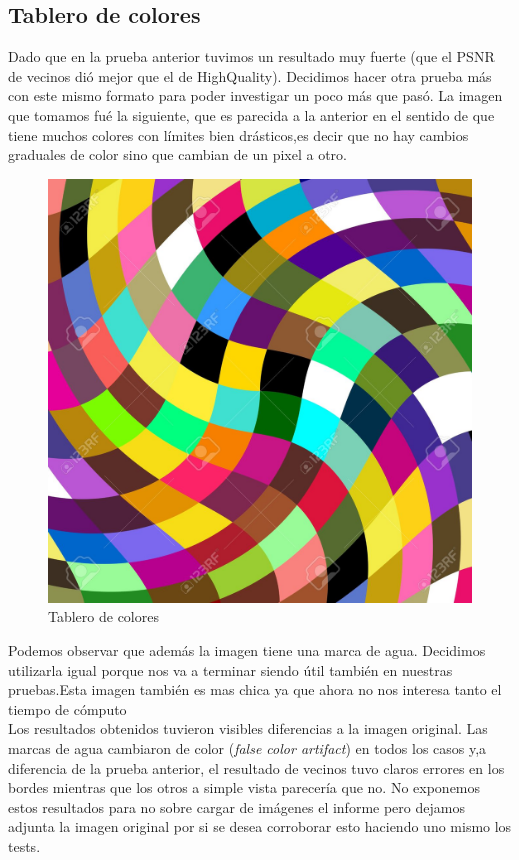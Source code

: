 {\subsection{Tablero de colores}
Dado que en la prueba anterior tuvimos un resultado muy fuerte (que el PSNR de vecinos dió mejor que el de HighQuality). Decidimos hacer otra prueba más con este mismo formato para poder investigar un poco más que pasó.
La imagen que tomamos fué la siguiente, que es parecida a la anterior en el sentido de que tiene muchos colores con límites bien drásticos,es decir que no hay cambios graduales de color sino que cambian de un pixel a otro. 
\begin{figure}[!htb]
\begin{center}
       \includegraphics[scale=0.2]{imagenes/cuadrados_colores.png}
       \caption{Tablero de colores}
        \end{center}

\end{figure}

Podemos observar que además la imagen tiene una marca de agua. Decidimos utilizarla igual porque nos va a terminar siendo útil también en nuestras pruebas.Esta imagen también es mas chica ya que ahora no nos interesa tanto el tiempo de cómputo\\
Los resultados obtenidos tuvieron visibles diferencias a la imagen original. Las marcas de agua cambiaron de color (\textit{false color artifact}) en todos los casos y,a diferencia de la prueba anterior, el resultado de vecinos tuvo claros errores en los bordes mientras que los otros a simple vista parecería que no. No exponemos estos resultados para no sobre cargar de imágenes el informe pero dejamos adjunta la imagen original por si se desea corroborar esto haciendo uno mismo los tests.\\
}
